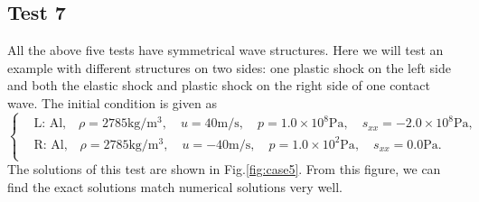\documentclass[review]{elsarticle}
\numberwithin{equation}{section}
\numberwithin{table}{section}
\begin{document}
\subsection{Test 7}
All the above five tests have symmetrical wave  structures. Here we will test an example with different structures on two sides: one plastic shock on the left side and both the elastic shock  and plastic shock on the right side of one contact wave. The initial condition is given as
\begin{equation}
 \left\{ \begin{aligned}
&	 \text{L: Al,}\quad  \rho = 2785 \text{kg}/\text{m}^3, \quad  u = 40\text{m}/\text{s}, \quad  p = 1.0\times 10^8\text{Pa}, \quad  s_{xx}=-2.0\times 10^8 \text{Pa},\\
&	 \text{R: Al,}\quad  \rho = 2785 \text{kg}/\text{m}^3, \quad  u = -40\text{m}/\text{s}, \quad  p = 1.0 \times 10^2 \text{Pa}, \quad  s_{xx}=0.0\text{Pa}.\\
   \end{aligned}
 \right.
\end{equation}
The solutions of this test are shown in Fig.\ref{fig:case5}. From this figure, we can find the exact solutions match numerical solutions very well.
\end{document}
